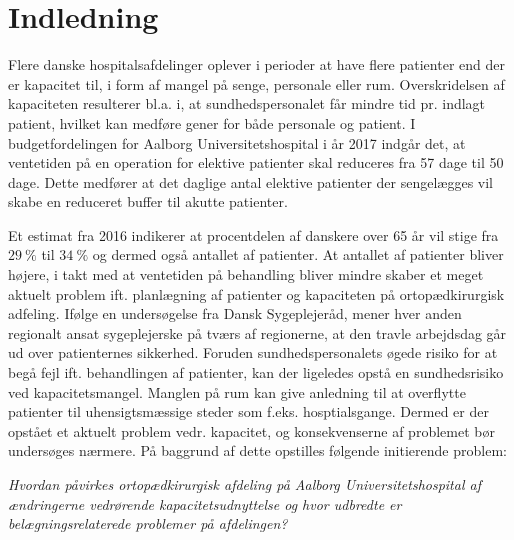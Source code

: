 \chapter{Indledning}


Flere danske hospitalsafdelinger oplever i perioder at have flere patienter end der er kapacitet til, i form af mangel på senge, personale eller rum\cite{Company2013}. Overskridelsen af kapaciteten resulterer bl.a. i, at sundhedspersonalet får mindre tid pr. indlagt patient, hvilket kan medføre gener for både personale og patient.\cite{Kjeldsen2015} I budgetfordelingen for Aalborg Universitetshospital i år 2017 indgår det, at ventetiden på en operation for elektive patienter skal reduceres fra 57 dage til 50 dage\cite{Budget2016}. Dette medfører at det daglige antal elektive patienter der sengelægges vil skabe en reduceret buffer til akutte patienter. 

Et estimat fra 2016 indikerer at procentdelen af danskere over 65 år vil stige fra $29~\%$ til $34~\%$ og dermed også antallet af patienter\cite{RegionNord2016}. At antallet af patienter bliver højere, i takt med at ventetiden på behandling bliver mindre skaber et meget aktuelt problem ift. planlægning af patienter og kapaciteten på ortopædkirurgisk adfeling. 
Ifølge en undersøgelse fra Dansk Sygeplejeråd, mener hver anden regionalt ansat sygeplejerske på tværs af regionerne, at den travle arbejdsdag går ud over patienternes sikkerhed\cite{Kjeldsen2015}. Foruden sundhedspersonalets øgede risiko for at begå fejl ift. behandlingen af patienter, kan der ligeledes opstå en sundhedsrisiko ved kapacitetsmangel. Manglen på rum kan give anledning til at overflytte patienter til uhensigtsmæssige steder som f.eks. hosptialsgange\cite{Madsen2014}. Dermed er der opstået et aktuelt problem vedr. kapacitet, og konsekvenserne af problemet bør undersøges nærmere. På baggrund af dette opstilles følgende initierende problem:

\textit{Hvordan påvirkes ortopædkirurgisk afdeling på Aalborg Universitetshospital af ændringerne vedrørende kapacitetsudnyttelse og hvor udbredte er belægningsrelaterede problemer på afdelingen?}






